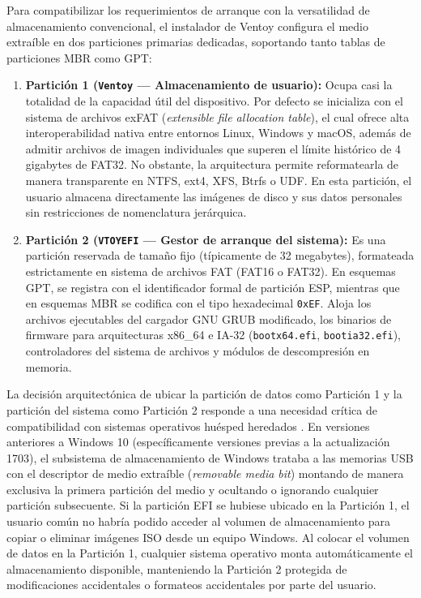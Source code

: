 \documentclass[12pt]{article}
\begin{document}
Para compatibilizar los requerimientos de arranque con la versatilidad de almacenamiento convencional, el instalador de Ventoy configura el medio extraíble en dos particiones primarias dedicadas, soportando tanto tablas de particiones MBR como GPT:
\begin{enumerate}[noitemsep, topsep=2pt]
    \item \textbf{Partición 1 (\texttt{Ventoy} — Almacenamiento de usuario):} Ocupa casi la totalidad de la capacidad útil del dispositivo. Por defecto se inicializa con el sistema de archivos exFAT (\textit{extensible file allocation table}), el cual ofrece alta interoperabilidad nativa entre entornos Linux, Windows y macOS, además de admitir archivos de imagen individuales que superen el límite histórico de 4 gigabytes de FAT32. No obstante, la arquitectura permite reformatearla de manera transparente en NTFS, ext4, XFS, Btrfs o UDF. En esta partición, el usuario almacena directamente las imágenes de disco y sus datos personales sin restricciones de nomenclatura jerárquica.
    \item \textbf{Partición 2 (\texttt{VTOYEFI} — Gestor de arranque del sistema):} Es una partición reservada de tamaño fijo (típicamente de 32 megabytes), formateada estrictamente en sistema de archivos FAT (FAT16 o FAT32). En esquemas GPT, se registra con el identificador formal de partición ESP, mientras que en esquemas MBR se codifica con el tipo hexadecimal \texttt{0xEF}. Aloja los archivos ejecutables del cargador GNU GRUB modificado, los binarios de firmware para arquitecturas x86\_64 e IA-32 (\texttt{bootx64.efi}, \texttt{bootia32.efi}), controladores del sistema de archivos y módulos de descompresión en memoria.
\end{enumerate}

La decisión arquitectónica de ubicar la partición de datos como Partición 1 y la partición del sistema como Partición 2 responde a una necesidad crítica de compatibilidad con sistemas operativos huésped heredados \parencite{ventoy2024documentation}. En versiones anteriores a Windows 10 (específicamente versiones previas a la actualización 1703), el subsistema de almacenamiento de Windows trataba a las memorias USB con el descriptor de medio extraíble (\textit{removable media bit}) montando de manera exclusiva la primera partición del medio y ocultando o ignorando cualquier partición subsecuente. Si la partición EFI se hubiese ubicado en la Partición 1, el usuario común no habría podido acceder al volumen de almacenamiento para copiar o eliminar imágenes ISO desde un equipo Windows. Al colocar el volumen de datos en la Partición 1, cualquier sistema operativo monta automáticamente el almacenamiento disponible, manteniendo la Partición 2 protegida de modificaciones accidentales o formateos accidentales por parte del usuario.
\end{document}
